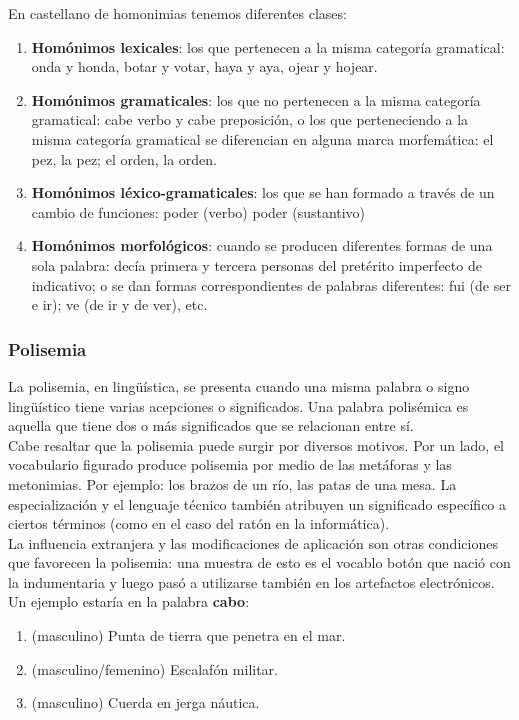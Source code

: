 \documentclass[../all.tex]{subfiles}
\begin{document}
	En castellano de homonimias tenemos diferentes clases:
	
	\begin{enumerate}[resume]
		\setcounter{enumi}{0}
		\item \textbf{Homónimos lexicales}: los que pertenecen a la misma categoría gramatical: onda y honda, botar y votar, haya y aya, ojear y hojear.
		\item \textbf{Homónimos gramaticales}: los que no pertenecen a la misma categoría gramatical: cabe verbo y cabe preposición, o los que perteneciendo a la misma categoría gramatical se diferencian en alguna marca morfemática: el pez, la pez; el orden, la orden.
		\item \textbf{Homónimos léxico-gramaticales}: los que se han formado a través de un cambio de funciones: poder (verbo) poder (sustantivo)
		\item \textbf{Homónimos morfológicos}: cuando se producen diferentes formas de una sola palabra: decía primera y tercera personas del pretérito imperfecto de indicativo; o se dan formas correspondientes de palabras diferentes: fui (de ser e ir); ve (de ir y de ver), etc.
	\end{enumerate}

\subsubsection{Polisemia}
	La polisemia, en lingüística, se presenta cuando una misma palabra o signo lingüístico tiene varias acepciones o significados. Una palabra polisémica es aquella que tiene dos o más significados que se relacionan entre sí.\\
	
	Cabe resaltar que la polisemia puede surgir por diversos motivos. Por un lado, el vocabulario figurado produce polisemia por medio de las metáforas y las metonimias. Por ejemplo: los brazos de un río, las patas de una mesa. La especialización y el lenguaje técnico también atribuyen un significado específico a ciertos términos (como en el caso del ratón en la informática).\\
	
	La influencia extranjera y las modificaciones de aplicación son otras condiciones que favorecen la polisemia: una muestra de esto es el vocablo botón que nació con la indumentaria y luego pasó a utilizarse también en los artefactos electrónicos.\\
	
	Un ejemplo estaría en la palabra \textbf{cabo}:
	\begin{enumerate}[resume]
		\setcounter{enumi}{0}
		\item (masculino) Punta de tierra que penetra en el mar.
		\item (masculino/femenino) Escalafón militar.
		\item (masculino) Cuerda en jerga náutica.
	\end{enumerate}
\newpage
\end{document}
